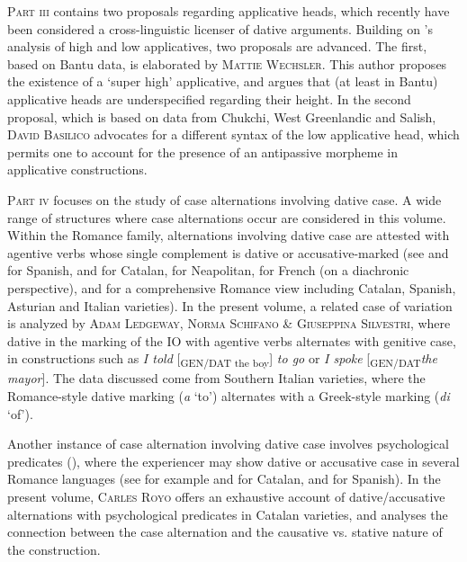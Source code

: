 \documentclass[output=paper,modfonts,nonflat,colorlinks,citecolor=brown]{langsci/langscibook}
\begin{document}
{\textsc{Part iii}} contains two proposals regarding applicative heads, which recently have been considered a cross-linguistic licenser of dative arguments. Building on \citeauthor{Pylkkänen2002}'s \citeyear{Pylkkänen2002, Pylkkänen2008} analysis of high and low applicatives, two proposals are advanced. The first, based on Bantu data, is elaborated by {\textsc{Mattie Wechsler}}. This author proposes the existence of a ‘super high’ applicative, and argues that (at least in Bantu) applicative heads are underspecified regarding their height. In the second proposal, which is based on data from Chukchi, West Greenlandic and Salish, {\textsc{David Basilico}} advocates for a different syntax of the low applicative head, which permits one to account for the presence of an antipassive morpheme in applicative constructions.



{\textsc{Part iv}} focuses on the study of case alternations involving dative case. A wide range of structures where case alternations occur are considered in this volume. Within the Romance family, alternations involving dative case are attested with agentive verbs whose single complement is dative or accusative-marked (see \citealt{FernándezOrdóñez1999} and \citealt{Sáez2009} for Spanish, \citealt{Ramos2005,Morant2008,PinedaRoyo2017} and \citet{Pineda2019}
for Catalan, \citealt{Ledgeway2000} for Neapolitan, \citealt{Troberg2008} for French (on a diachronic perspective), and \citealt{Pineda2016} for a comprehensive Romance view including Catalan, Spanish, Asturian and Italian varieties). In the present volume, a related case of variation is analyzed by {\textsc{Adam Ledgeway, Norma Schifano \& Giuseppina Silvestri}}, where dative in the marking of the IO with agentive verbs alternates with genitive case, in constructions such as {\textit{I told}} [{\textsubscript{GEN/DAT the boy}}]{ \textit{to go}} or {\textit{I spoke}} [{\textsubscript{GEN/DAT}\textit{the mayor}}]. The data discussed come from Southern Italian varieties, where the Romance-style dative marking ({\textit{a}} ‘to’) alternates with a Greek-style marking ({\textit{di}} ‘of’).



Another instance of case alternation involving dative case involves psychological predicates ({\citealt{BellettiRizzi1988}}), where the experiencer may show dative or accusative case in several Romance languages (see for example \citealt{CabréMateu1998,PinedaRoyo2017} and \citealt{Royo2017} for Catalan, and \citealt{FernándezOrdóñez1999} for Spanish). In the present volume, {\textsc{Carles Royo}} offers an exhaustive account of dative/accusative alternations with psychological predicates in Catalan varieties, and analyses the connection between the case alternation and the causative vs. stative nature of the construction.
\end{document}
